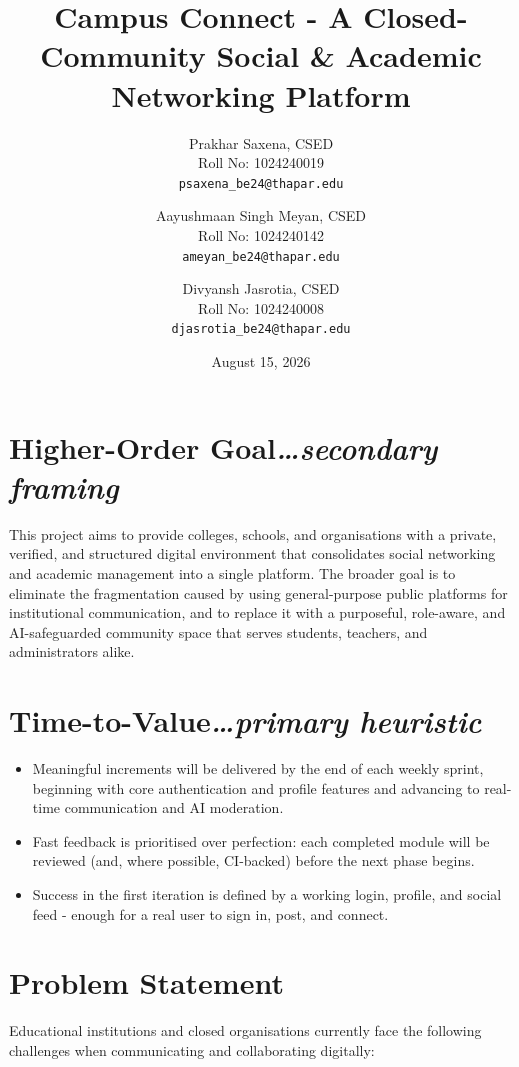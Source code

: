 \documentclass[11pt,a4paper]{article}
\title{Campus Connect - A Closed-Community Social \& Academic Networking Platform}
\author{
  \begin{tabular}[t]{c}
    Prakhar Saxena, CSED \\
    {\small Roll No: 1024240019} \\
    {\small \nolinkurl{psaxena_be24@thapar.edu}}
  \end{tabular}
  \and
  \begin{tabular}[t]{c}
    Aayushmaan Singh Meyan, CSED \\
    {\small Roll No: 1024240142} \\
    {\small \nolinkurl{ameyan_be24@thapar.edu}}
  \end{tabular}
  \and
  \begin{tabular}[t]{c}
    Divyansh Jasrotia, CSED \\
    {\small Roll No: 1024240008} \\
    {\small \nolinkurl{djasrotia_be24@thapar.edu}}
  \end{tabular}
}
\date{August 15, 2026}
\newcommand{\BvrHint}[1]{{\normalfont\normalsize\itshape\hfill #1}}
\begin{document}
\maketitle

\section{Higher-Order Goal\BvrHint{\ldots secondary framing}}

This project aims to provide colleges, schools, and organisations with a private, verified, and structured digital environment that consolidates social networking and academic management into a single platform. The broader goal is to eliminate the fragmentation caused by using general-purpose public platforms for institutional communication, and to replace it with a purposeful, role-aware, and AI-safeguarded community space that serves students, teachers, and administrators alike.

\section{Time-to-Value\BvrHint{\ldots primary heuristic}}
\begin{itemize}[leftmargin=0.7cm]
    \item Meaningful increments will be delivered by the end of each weekly sprint, beginning with core authentication and profile features and advancing to real-time communication and AI moderation.
    \item Fast feedback is prioritised over perfection: each completed module will be reviewed (and, where possible, CI-backed) before the next phase begins.
    \item Success in the first iteration is defined by a working login, profile, and social feed - enough for a real user to sign in, post, and connect.
\end{itemize}

\section{Problem Statement}

Educational institutions and closed organisations currently face the following challenges when communicating and collaborating digitally:
\end{document}
